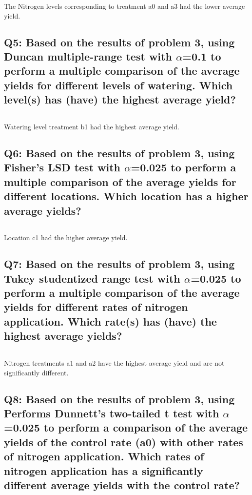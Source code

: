 \documentclass[a4paper,man,natbib]{apa6}
\begin{document}
The Nitrogen levels corresponding to treatment a0 and a3 had the lower average yield.

\subsection*{Q5: Based on the results of problem 3, using Duncan multiple-range test with $\alpha$=0.1 to perform a multiple comparison of the average yields for different levels of watering. Which level(s) has (have) the highest average yield? }
\inputminted[breaklines,bgcolor=light-gray]{sas}{./Snippets/DAT502-HW5-5.sas}
% 

Watering level treatment b1 had the highest average yield.

\subsection*{Q6: Based on the results of problem 3, using Fisher’s LSD test with $\alpha$=0.025 to perform a multiple comparison of the average yields for different locations. Which location has a higher average yields? }
\inputminted[breaklines,bgcolor=light-gray]{sas}{./Snippets/DAT502-HW5-6.sas}
% 

Location c1 had the higher average yield.

\subsection*{Q7: Based on the results of problem 3, using Tukey studentized range test with $\alpha$=0.025 to perform a multiple comparison of the average yields for different rates of nitrogen application. Which rate(s) has (have) the highest average yields? }
\inputminted[breaklines,bgcolor=light-gray]{sas}{./Snippets/DAT502-HW5-7.sas}
% 

Nitrogen treatments a1 and a2 have the highest average yield and are not significantly different.

\subsection*{Q8: Based on the results of problem 3, using Performs Dunnett’s two-tailed t test with $\alpha$=0.025 to perform a comparison of the average yields of the control rate (a0) with other rates of nitrogen application. Which rates of nitrogen application has a significantly different average yields with the control rate? }
\inputminted[breaklines,bgcolor=light-gray]{sas}{./Snippets/DAT502-HW5-8.sas}
% 
\end{document}
